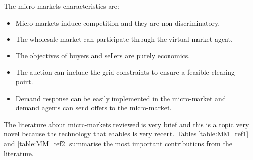 \documentclass[a4paper,11pt,twoside,openright]{report}
\begin{document}
The micro-markets characteristics are:
\begin{itemize}
	\item Micro-markets induce competition and they are non-discriminatory.
	\item The wholesale market can participate through the virtual market agent.
	\item The objectives of buyers and sellers are purely economics.
	\item The auction can include the grid constraints to ensure a feasible clearing point. 
	\item Demand response can be easily implemented in the micro-market and demand agents can send offers to the micro-market.
\end{itemize}

The literature about micro-markets reviewed is very brief and this is a topic very novel because the technology that enables is very recent. Tables \ref{table:MM_ref1} and \ref{table:MM_ref2} summarise the most important contributions from the literature.
\end{document}
